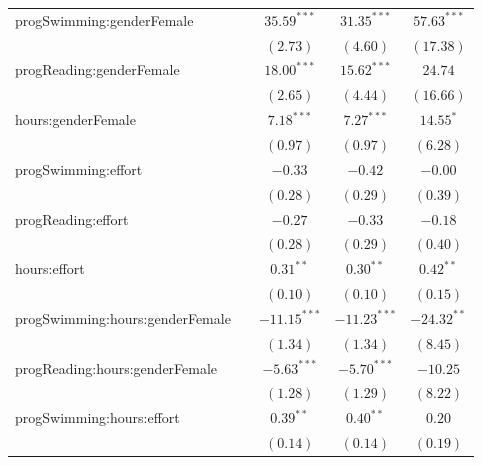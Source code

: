 \documentclass[
]{article}
\begin{document}
\begin{table}
\begin{center}
\begin{tabular}{l c c c c}
progSwimming:genderFemale              &                & $35.59^{***}$  & $31.35^{***}$  & $57.63^{***}$ \\
                                       &                & $(2.73)$       & $(4.60)$       & $(17.38)$     \\
progReading:genderFemale               &                & $18.00^{***}$  & $15.62^{***}$  & $24.74$       \\
                                       &                & $(2.65)$       & $(4.44)$       & $(16.66)$     \\
hours:genderFemale                     &                & $7.18^{***}$   & $7.27^{***}$   & $14.55^{*}$   \\
                                       &                & $(0.97)$       & $(0.97)$       & $(6.28)$      \\
progSwimming:effort                    &                & $-0.33$        & $-0.42$        & $-0.00$       \\
                                       &                & $(0.28)$       & $(0.29)$       & $(0.39)$      \\
progReading:effort                     &                & $-0.27$        & $-0.33$        & $-0.18$       \\
                                       &                & $(0.28)$       & $(0.29)$       & $(0.40)$      \\
hours:effort                           &                & $0.31^{**}$    & $0.30^{**}$    & $0.42^{**}$   \\
                                       &                & $(0.10)$       & $(0.10)$       & $(0.15)$      \\
progSwimming:hours:genderFemale        &                & $-11.15^{***}$ & $-11.23^{***}$ & $-24.32^{**}$ \\
                                       &                & $(1.34)$       & $(1.34)$       & $(8.45)$      \\
progReading:hours:genderFemale         &                & $-5.63^{***}$  & $-5.70^{***}$  & $-10.25$      \\
                                       &                & $(1.28)$       & $(1.29)$       & $(8.22)$      \\
progSwimming:hours:effort              &                & $0.39^{**}$    & $0.40^{**}$    & $0.20$        \\
                                       &                & $(0.14)$       & $(0.14)$       & $(0.19)$      \\

\end{tabular}
\end{center}
\end{table}
\end{document}
